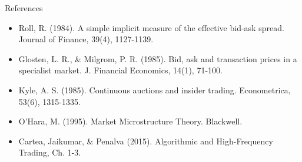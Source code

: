 \documentclass[aspectratio=169,10pt]{beamer}
\begin{document}
\begin{frame}{References}
\scriptsize\begin{itemize}\setlength{\itemsep}{3pt}
  \item Roll, R. (1984). A simple implicit measure of the effective bid-ask spread. Journal of Finance, 39(4), 1127-1139.
  \item Glosten, L. R., \& Milgrom, P. R. (1985). Bid, ask and transaction prices in a specialist market. J. Financial Economics, 14(1), 71-100.
  \item Kyle, A. S. (1985). Continuous auctions and insider trading. Econometrica, 53(6), 1315-1335.
  \item O'Hara, M. (1995). Market Microstructure Theory. Blackwell.
  \item Cartea, Jaikumar, \& Penalva (2015). Algorithmic and High-Frequency Trading, Ch. 1-3.
\end{itemize}
\end{frame}
\end{document}
